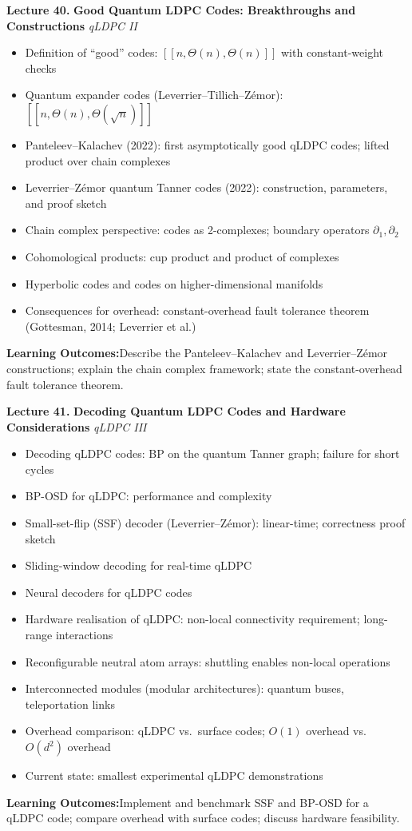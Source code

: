 \documentclass[12pt,oneside]{article}
\newcommand{\lecturetitle}[3]{%
  \vspace{10pt}
  \begin{tcolorbox}[
    enhanced,breakable,
    colback=highlight,colframe=accent,
    arc=2pt,left=10pt,right=8pt,top=7pt,bottom=7pt,boxrule=0.7pt
  ]
    \textbf{\color{accent}Lecture #1.\enspace}%
    {\color{primary}\bfseries #2}%
    \hfill{\small\color{warmgold}\textit{#3}}
  \end{tcolorbox}
  \vspace{-2pt}
}
\newcommand{\topics}[1]{%
  \begin{itemize}[leftmargin=1.5em,itemsep=1.5pt,topsep=3pt,parsep=0pt]
    #1
  \end{itemize}\vspace{2pt}
}
\newcommand{\T}[1]{\item #1}
\newcommand{\keybox}[1]{%
  \begin{tcolorbox}[
    enhanced,colback=lightgray,colframe=rulegray,
    arc=2pt,left=8pt,right=8pt,top=5pt,bottom=5pt,boxrule=0.4pt,
    fontupper=\small
  ]
    \textbf{\color{primary}Learning Outcomes:\enspace}#1
  \end{tcolorbox}\vspace{4pt}
}
\begin{document}
\lecturetitle{40}{Good Quantum LDPC Codes: Breakthroughs and Constructions}{qLDPC II}

\topics{
  \T{Definition of ``good'' codes: $[[n, \Theta(n), \Theta(n)]]$ with constant-weight checks}
  \T{Quantum expander codes (Leverrier--Tillich--Z{\'e}mor): $[[n, \Theta(n), \Theta(\sqrt{n})]]$}
  \T{Panteleev--Kalachev (2022): first asymptotically good qLDPC codes; lifted product over chain complexes}
  \T{Leverrier--Z{\'e}mor quantum Tanner codes (2022): construction, parameters, and proof sketch}
  \T{Chain complex perspective: codes as 2-complexes; boundary operators $\partial_1, \partial_2$}
  \T{Cohomological products: cup product and product of complexes}
  \T{Hyperbolic codes and codes on higher-dimensional manifolds}
  \T{Consequences for overhead: constant-overhead fault tolerance theorem (Gottesman, 2014; Leverrier et al.)}
}

\keybox{Describe the Panteleev--Kalachev and Leverrier--Z{\'e}mor constructions; explain the chain complex framework; state the constant-overhead fault tolerance theorem.}

\lecturetitle{41}{Decoding Quantum LDPC Codes and Hardware Considerations}{qLDPC III}

\topics{
  \T{Decoding qLDPC codes: BP on the quantum Tanner graph; failure for short cycles}
  \T{BP-OSD for qLDPC: performance and complexity}
  \T{Small-set-flip (SSF) decoder (Leverrier--Z{\'e}mor): linear-time; correctness proof sketch}
  \T{Sliding-window decoding for real-time qLDPC}
  \T{Neural decoders for qLDPC codes}
  \T{Hardware realisation of qLDPC: non-local connectivity requirement; long-range interactions}
  \T{Reconfigurable neutral atom arrays: shuttling enables non-local operations}
  \T{Interconnected modules (modular architectures): quantum buses, teleportation links}
  \T{Overhead comparison: qLDPC vs.\ surface codes; $O(1)$ overhead vs.\ $O(d^2)$ overhead}
  \T{Current state: smallest experimental qLDPC demonstrations}
}

\keybox{Implement and benchmark SSF and BP-OSD for a qLDPC code; compare overhead with surface codes; discuss hardware feasibility.}

\newpage
\end{document}
